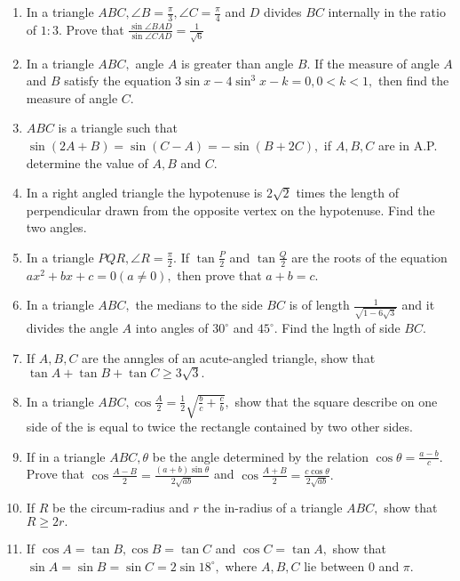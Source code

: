 \begin{enumerate}
\item In a triangle $ABC, \angle B = \frac{\pi}{3}, \angle C= \frac{\pi}{4}$ and $D$ divides $BC$ internally in the
   ratio of $1:3.$ Prove that $\frac{\sin\angle BAD}{\sin\angle CAD} = \frac{1}{\sqrt{6}}$

\item In a triangle $ABC,$ angle $A$ is greater than angle $B.$ If the measure of angle $A$ and $B$
   satisfy the equation $3\sin x - 4\sin^3x - k = 0, 0< k < 1,$ then find the measure of angle $C.$

\item $ABC$ is a triangle such that $\sin(2A + B) = \sin(C - A) = -\sin(B + 2C),$ if $A, B, C$ are in A.P. determine
   the value of $A, B$ and $C.$

\item In a right angled triangle the hypotenuse is $2\sqrt{2}$ times the length of perpendicular drawn from the opposite vertex
   on the hypotenuse. Find the two angles.

\item In a triangle $PQR, \angle R = \frac{\pi}{2}.$ If $\tan\frac{P}{2}$ and $\tan\frac{Q}{2}$ are the roots of the
   equation $ax^2 + bx + c = 0(a\neq 0),$ then prove that $a + b = c.$

\item In a triangle $ABC,$ the medians to the side $BC$ is of length $\frac{1}{\sqrt{1 - 6\sqrt{3}}}$ and it divides
   the angle $A$ into angles of $30^\circ$ and $45^\circ.$ Find the lngth of side $BC.$

\item If $A, B, C$ are the anngles of an acute-angled triangle, show that $\tan A + \tan B + \tan C \geq 3\sqrt{3}.$

\item In a triangle $ABC, \cos \frac{A}{2} = \frac{1}{2}\sqrt{\frac{b}{c} + \frac{c}{b}},$ show that the square describe on one
   side of the is equal to twice the rectangle contained by two other sides.

\item If in a triangle $ABC, \theta$ be the angle determined by the relation $\cos\theta = \frac{a - b}{c}.$ Prove that
   $\cos\frac{A - B}{2} = \frac{(a + b)\sin\theta}{2\sqrt{ab}}$ and $\cos \frac{A+B}{2} =
   \frac{c\cos\theta}{2\sqrt{ab}}.$

\item If $R$ be the circum-radius and $r$ the in-radius of a triangle $ABC,$ show that $R\geq 2r.$

\item If $\cos A = \tan B, \cos B = \tan C$ and $\cos C = \tan A,$ show that $\sin A = \sin B = \sin C = 2\sin
   18^\circ,$ where $A, B, C$ lie between $0$ and $\pi.$


\end{enumerate}

